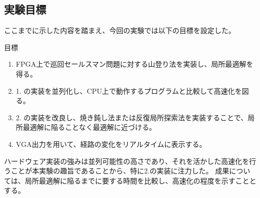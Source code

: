 \subsection{実験目標}\label{sec:goal}
ここまでに示した内容を踏まえ、今回の実験では以下の目標を設定した。
\begin{itembox}[h]{目標}
    \begin{enumerate}
        \item FPGA上で巡回セールスマン問題に対する山登り法を実装し、局所最適解を得る。
        \item 1. の実装を並列化し、CPU上で動作するプログラムと比較して高速化を図る。
        \item 2. の実装を改良し、焼き鈍し法または反復局所探索法を実装することで、局所最適解に陥ることなく最適解に近づける。
        \item VGA出力を用いて、経路の変化をリアルタイムに表示する。
    \end{enumerate}
\end{itembox}
ハードウェア実装の強みは並列可能性の高さであり、それを活かした高速化を行うことが本実験の趣旨であることから、特に2.の実装に注力した。
成果については、局所最適解に陥るまでに要する時間を比較し、高速化の程度を示すこととする。
